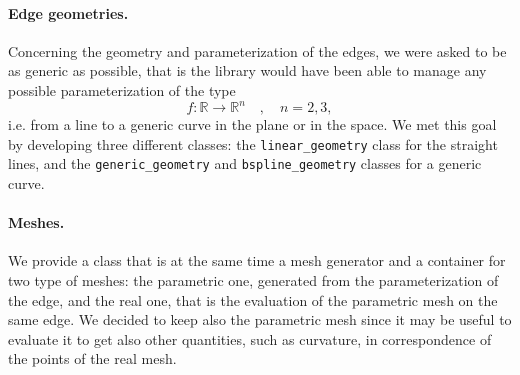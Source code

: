 \documentclass[11pt]{article} %
\newcommand{\classname}[1]{\texttt{#1}}
\begin{document}
		\paragraph{Edge geometries.} Concerning the geometry and parameterization of the edges, we were asked to be as generic as possible, that is the library would have been able to manage any possible parameterization of the type
		\begin{equation*}
			f:\mathbb{R}\rightarrow\mathbb{R}^{n} \quad, \quad n=2,3 ,
		\end{equation*}
		i.e. from a line to a generic curve in the plane or in the space. We met this goal by developing three different classes: the \classname{linear\_geometry} class for the straight lines, and the \classname{generic\_geometry} and \classname{bspline\_geometry} classes for a generic curve.
		\paragraph{Meshes.} We provide a class that is at the same time a mesh generator and a container for two type of meshes: the parametric one, generated from the parameterization of the edge, and the real one, that is the evaluation of the parametric mesh on the same edge. We decided to keep also the parametric mesh since it may be useful to evaluate it to get also other quantities, such as curvature, in correspondence of the points of the real mesh.
		
\end{document}
